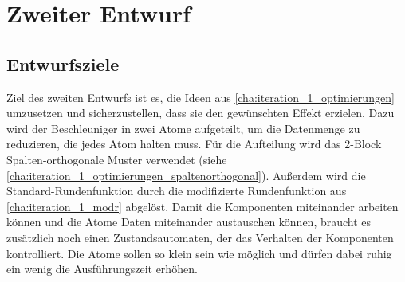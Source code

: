 \section{Zweiter Entwurf}
\subsection{Entwurfsziele}
Ziel des zweiten Entwurfs ist es, die Ideen aus \ref{cha:iteration_1_optimierungen} umzusetzen und sicherzustellen, dass sie den gewünschten Effekt erzielen.
Dazu wird der Beschleuniger in zwei Atome aufgeteilt, um die Datenmenge zu reduzieren, die jedes Atom halten muss.
Für die Aufteilung wird das 2-Block Spalten-orthogonale Muster verwendet (siehe \ref{cha:iteration_1_optimierungen_spaltenorthogonal}).
Außerdem wird die Standard-Rundenfunktion durch die modifizierte Rundenfunktion aus \ref{cha:iteration_1_modr} abgelöst.
Damit die Komponenten miteinander arbeiten können und die Atome Daten miteinander austauschen können, braucht es zusätzlich noch
einen Zustandsautomaten, der das Verhalten der Komponenten kontrolliert.
Die Atome sollen so klein sein wie möglich und dürfen dabei ruhig ein wenig die Ausführungszeit erhöhen.

